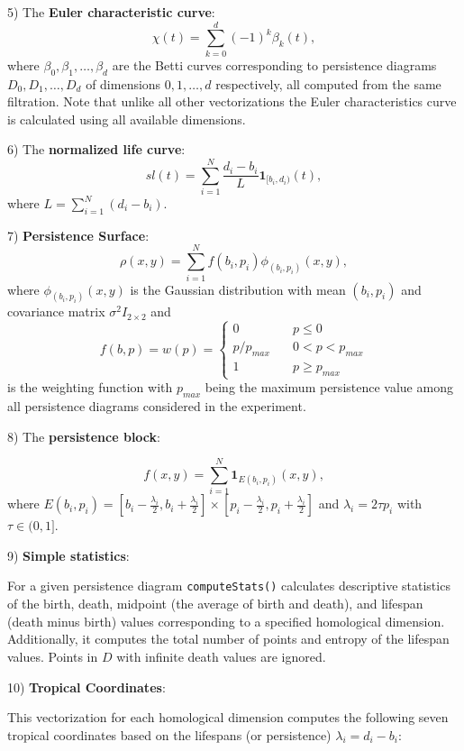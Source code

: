 \documentclass[conference, onecolumn]{IEEEtran}
\begin{document}
5) The \textbf{Euler characteristic curve}: 
$$
\chi(t)=\sum_{k=0}^d (-1)^k\beta_k(t),
$$ where $\beta_0,\beta_1,\ldots,\beta_d$ are the Betti curves corresponding to persistence diagrams $D_0,D_1,\ldots,D_d$ of dimensions $0,1,\ldots,d$ respectively, all computed from the same filtration. Note that unlike all other vectorizations the Euler characteristics curve is calculated using all available dimensions.

6) The \textbf{normalized life curve}: 
$$
sl(t)=\sum_{i=1}^N \frac{d_i-b_i}{L}\mathbf{1}_{[b_i,d_i)}(t),
$$ where $L=\sum_{i=1}^N (d_i-b_i)$.

7) \textbf{Persistence Surface}:
$$\rho(x,y)=\sum_{i=1}^N f(b_i,p_i)\phi_{(b_i,p_i)}(x,y),$$ where $\phi_{(b_i,p_i)}(x,y)$ is 
the Gaussian distribution with mean $(b_i,p_i)$ and 
covariance matrix $\sigma^2 I_{2\times 2}$ and 
$$
f(b,p) = w(p)=\left\{
        \begin{array}{ll}
            0 & \quad p\leq 0 \\
            p/p_{max} & \quad 0<p<p_{max}\\
            1& \quad p\geq p_{max}
        \end{array}
    \right.
$$
is the weighting function with $p_{max}$ being the maximum persistence value among all persistence diagrams considered in the experiment.

8) The \textbf{persistence block}:

$$
f(x,y)=\sum_{i=1}^N \mathbf 1_{E(b_i,p_i)}(x,y),
$$
where $E(b_i,p_i)=[b_i-\frac{\lambda_i}{2},b_i+\frac{\lambda_i}{2}]\times [p_i-\frac{\lambda_i}{2},p_i+\frac{\lambda_i}{2}]$ and $\lambda_i=2\tau p_i$ with $\tau\in (0,1]$.


9) \textbf{Simple statistics}:

\newcommand{\eqn}[1]{$#1$}
\newcommand{\code}[1]{\texttt{#1}}

For a given persistence diagram \code{computeStats()} calculates descriptive statistics of the birth, death, midpoint (the average of birth and death), and lifespan (death minus birth) values corresponding to a specified homological dimension. Additionally, it computes the total number of points and entropy of the lifespan values. Points in \eqn{D} with infinite death values are ignored.


10) \textbf{Tropical Coordinates}:

This vectorization for each homological dimension  computes the following seven tropical coordinates based on the lifespans (or persistence) \eqn{\lambda_i = d_i - b_i}:
\end{document}
